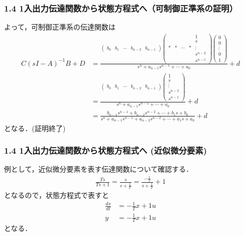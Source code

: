 \documentclass[10pt]{beamer}
\begin{document}
\begin{frame}[t]
\frametitle{1.4 1入出力伝達関数から状態方程式へ{\small （可制御正準系の証明）}}
よって，可制御正準系の伝達関数は
{\tiny
\begin{align}
 C(sI-A)^{-1}B + D
 &=
 \frac{
    \left(\begin{array}{ccccc}
        b_0 & b_1 & \cdots & b_{n-2} & b_{n-1}
    \end{array}\right)
    \left(\begin{array}{ccccc}
        &    &        &    &  1 \\
	    &    &        &    &  s \\
	  * &  * & \cdots &  * &  \vdots \\
	    &    &        &    &  s^{n-2} \\
	    &    &        &    &  s^{n-1}
	\end{array}\right)
    \left(\begin{array}{c}
         0 \\
	 0 \\
	 \vdots \\
	 0 \\
	 1
	\end{array}\right)
 }
 {s^n + a_{n-1} s^{n-1}  + \cdots + a_0}
    + d
\nonumber\\
 &=
 \frac{
    \left(\begin{array}{ccccc}
        b_0 & b_1 & \cdots & b_{n-2} & b_{n-1}
    \end{array}\right)
    \left(\begin{array}{c}
     1 \\
	 s \\
	 \vdots \\
	 s^{n-2} \\
	 s^{n-1}
	\end{array}\right)
 }
 {s^n + a_{n-1} s^{n-1}  + \cdots + a_0}
    + d
\nonumber \\
 &=
   \frac{b_{n-1} s^{n-1} + b_{n-2} s^{n-2} + \cdots + b_1 s + b_0}
  {s^n + a_{n-1} s^{n-1} + a_{n-2} s^{n-2} + \cdots + a_1 s + a_0}
  + d
\end{align}
}
となる．(証明終了)
\end{frame}

\begin{frame}[t]
\frametitle{1.4 1入出力伝達関数から状態方程式へ{ (近似微分要素)}}
例として，近似微分要素を表す伝達関数について確認する．
\begin{align}
 \frac{Ts}{Ts+1} = \frac{s}{s+\frac{1}{T}}
 = \frac{-\frac{1}{T}}{s+\frac{1}{T}} + 1
\end{align}
となるので，状態方程式で表すと
\begin{align}
 \frac{dx}{dt} &= -\frac{1}{T} x + 1u \\
 y             &= -\frac{1}{T} x + 1u
\end{align}
となる．
\end{frame}
\end{document}
